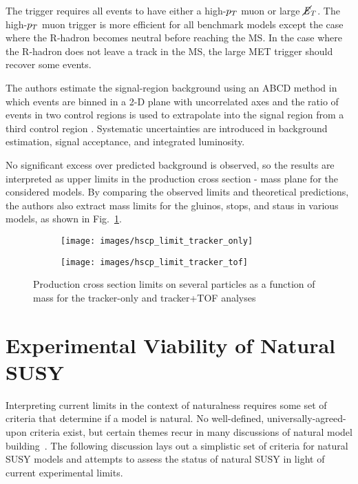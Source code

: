 \documentclass[12pt]{article}
\begin{document}
        The trigger requires all events to have either a high-$p_T$ muon or large $\cancel{\it{E}}_{T}$. The high-$p_T$ muon trigger is more efficient for all benchmark models except the case where the R-hadron becomes neutral before reaching the MS. In the case where the R-hadron does not leave a track in the MS, the large MET trigger should recover some events.  

        The authors estimate the signal-region background using an ABCD method in which events are binned in a 2-D plane with uncorrelated axes and the ratio of events in two control regions is used to extrapolate into the signal region from a third control region . Systematic uncertainties are introduced in background estimation, signal acceptance, and integrated luminosity.

        No significant excess over predicted background is observed, so the results are interpreted as upper limits in the production cross section - mass plane for the considered models. By comparing the observed limits and theoretical predictions, the authors also extract mass limits for the gluinos, stops, and staus in various models, as shown in Fig.~\ref{hscp_limits}.

        \noindent \begin{figure}[htbp] \begin{center}
        \begin{subfigure}[htbp]{0.4\textwidth} \begin{center}
        \texttt{[image: images/hscp\_limit\_tracker\_only]}
        \end{center} \end{subfigure}
        \begin{subfigure}[htbp]{0.4\textwidth} \begin{center}
        \texttt{[image: images/hscp\_limit\_tracker\_tof]}
        \end{center} \end{subfigure}
        \caption{Production cross section limits on several particles as a function of mass for the tracker-only and tracker+TOF analyses~\cite{cms_hscp}}
        \label{hscp_limits}
        \end{center} \end{figure}

\section{Experimental Viability of Natural SUSY}
    Interpreting current limits in the context of naturalness requires some set of criteria that determine if a model is natural. No well-defined, universally-agreed-upon criteria exist, but certain themes recur in many discussions of natural model building~\cite{craig, vestiges, evans_toward_full, feng, cornering, kim}. The following discussion lays out a simplistic set of criteria for natural SUSY models and attempts to assess the status of natural SUSY in light of current experimental limits.
    
\end{document}
